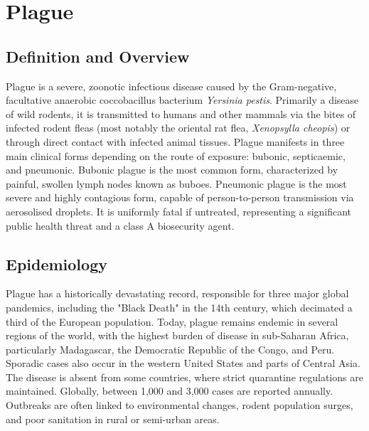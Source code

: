 \chapter{Plague}

\section*{Definition and Overview}
Plague is a severe, zoonotic infectious disease caused by the Gram-negative, facultative anaerobic coccobacillus bacterium \textit{Yersinia pestis}. Primarily a disease of wild rodents, it is transmitted to humans and other mammals via the bites of infected rodent fleas (most notably the oriental rat flea, \textit{Xenopsylla cheopis}) or through direct contact with infected animal tissues. Plague manifests in three main clinical forms depending on the route of exposure: bubonic, septicaemic, and pneumonic. Bubonic plague is the most common form, characterized by painful, swollen lymph nodes known as buboes. Pneumonic plague is the most severe and highly contagious form, capable of person-to-person transmission via aerosolised droplets. It is uniformly fatal if untreated, representing a significant public health threat and a class A biosecurity agent.

\section*{Epidemiology}
Plague has a historically devastating record, responsible for three major global pandemics, including the "Black Death" in the 14th century, which decimated a third of the European population. Today, plague remains endemic in several regions of the world, with the highest burden of disease in sub-Saharan Africa, particularly Madagascar, the Democratic Republic of the Congo, and Peru. Sporadic cases also occur in the western United States and parts of Central Asia. The disease is absent from some countries, where strict quarantine regulations are maintained. Globally, between 1,000 and 3,000 cases are reported annually. Outbreaks are often linked to environmental changes, rodent population surges, and poor sanitation in rural or semi-urban areas.

